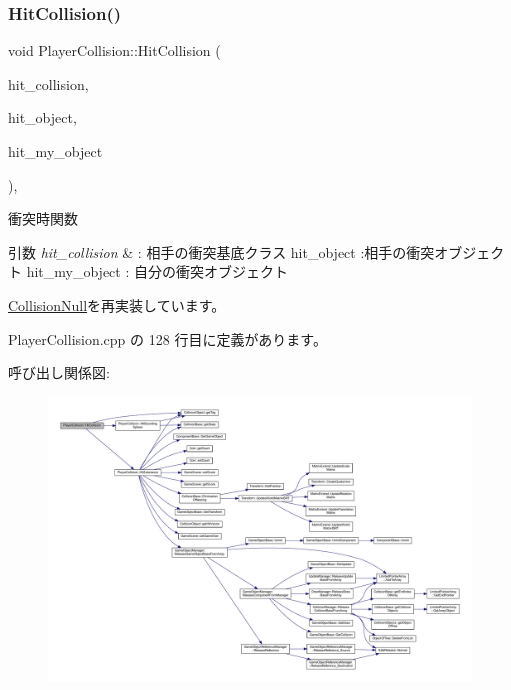\subsubsection{\texorpdfstring{Hit\+Collision()}{HitCollision()}}
{\footnotesize\ttfamily void Player\+Collision\+::\+Hit\+Collision (\begin{DoxyParamCaption}\item[{\mbox{\hyperlink{class_collision_base}{Collision\+Base}} $\ast$}]{hit\+\_\+collision,  }\item[{\mbox{\hyperlink{class_collision_object}{Collision\+Object}} $\ast$}]{hit\+\_\+object,  }\item[{\mbox{\hyperlink{class_collision_object}{Collision\+Object}} $\ast$}]{hit\+\_\+my\+\_\+object }\end{DoxyParamCaption})\hspace{0.3cm}{\ttfamily [override]}, {\ttfamily [virtual]}}



衝突時関数 


\begin{DoxyParams}{引数}
{\em hit\+\_\+collision} & \+: 相手の衝突基底クラス hit\+\_\+object \+:相手の衝突オブジェクト hit\+\_\+my\+\_\+object \+: 自分の衝突オブジェクト \\
\hline
\end{DoxyParams}


\mbox{\hyperlink{class_collision_null_a580f507d8918865679feec3cc7b613d1}{Collision\+Null}}を再実装しています。



 Player\+Collision.\+cpp の 128 行目に定義があります。

呼び出し関係図\+:
\nopagebreak
\begin{figure}[H]
\begin{center}
\leavevmode
\includegraphics[width=350pt]{class_player_collision_ad937a5fd226e742270202bf4eff53767_cgraph}
\end{center}
\end{figure}
\mbox{\label{class_player_collision_a3522ce17b1e1752f2737c2243582ecb0}} 
